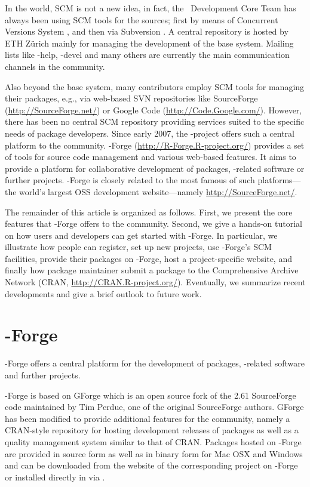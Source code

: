 In the \R{} world, SCM is not a new idea, in fact, the \R{}~Development
Core Team has always been using SCM tools for the \R{} sources; first by means of
Concurrent Versions System \citep[CVS, see][]{forge:Cederqvist:2006},
and then via Subversion \citep[SVN, see][]{forge:Pilato+Collins-Sussman+Fitzpatrick:2004}.
A central repository is hosted by ETH Z\"urich mainly for
managing the development of the base \R{} system. Mailing lists like
\R{}-help, \R{}-devel and many others are currently the main communication
channels in the \R{} community.

Also beyond the base system, many \R{} contributors employ
SCM tools for managing their \R{} packages, e.g., via web-based
SVN repositories like SourceForge (\url{http://SourceForge.net/})
or Google Code (\url{http://Code.Google.com/}). However, there has been
no central SCM repository providing services suited to the specific
needs of \R{} package developers.
Since early 2007, the \R{}-project offers such a central platform to the \R{}
community. \R{}-Forge (\url{http://R-Forge.R-project.org/}) provides a set
of tools for source code management and various web-based
features. It aims to provide a platform for collaborative development of
\R{} packages, \R{}-related software or further projects. \R{}-Forge is
closely related to the most famous of such platforms---the 
world's largest OSS development website---namely
\url{http://SourceForge.net/}.

The remainder of this article is organized as follows. First, we
present the core 
features that \R{}-Forge offers to the \R{} community. Second, we
give a hands-on tutorial on how users and developers can get started with 
\R{}-Forge. In particular, we illustrate how people
can register, set up new projects, use \R{}-Forge's SCM
facilities, provide their packages on \R{}-Forge, host a
project-specific website, and 
finally how package maintainer submit a package to the Comprehensive \R{}
Archive Network (CRAN, \url{http://CRAN.R-project.org/}).
Eventually, we summarize recent developments and give a brief outlook
to future work.


\section{\R{}-Forge}
\R{}-Forge offers a central platform for the development of \R{}
packages, \R{}-related software and further projects. 

\R{}-Forge is based on GForge \citep{forge:copeland_et_al:2006} which is
an open source fork of the 2.61 SourceForge code maintained by Tim
Perdue, one of the original SourceForge authors. GForge has been
modified to provide additional features for the \R{} community, namely
a CRAN-style repository for hosting development releases of \R{}
packages as well as a quality management system similar to that of
CRAN.
Packages hosted on \R{}-Forge are provided in source form as well as
in binary form for Mac OSX and Windows and can be downloaded from the
website of the corresponding project on \R{}-Forge or installed
directly in \R{} via
.

